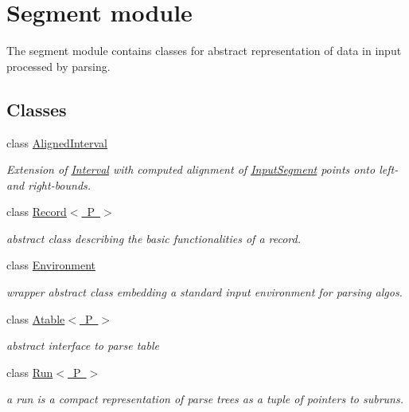 \hypertarget{group__segment}{}\section{Segment module}
\label{group__segment}


The {\ttfamily segment} module contains classes for abstract representation of data in input processed by parsing.  


\subsection*{Classes}
\begin{DoxyCompactItemize}
\item 
class \mbox{\hyperlink{classAlignedInterval}{Aligned\+Interval}}
\begin{DoxyCompactList}\small\item\em Extension of \mbox{\hyperlink{classInterval}{Interval}} with computed alignment of \mbox{\hyperlink{classInputSegment}{Input\+Segment}} points onto left-\/ and right-\/bounds. \end{DoxyCompactList}\item 
class \mbox{\hyperlink{classRecord}{Record$<$ P $>$}}
\begin{DoxyCompactList}\small\item\em abstract class describing the basic functionalities of a record. \end{DoxyCompactList}\item 
class \mbox{\hyperlink{classEnvironment}{Environment}}
\begin{DoxyCompactList}\small\item\em wrapper abstract class embedding a standard input environment for parsing algos. \end{DoxyCompactList}\item 
class \mbox{\hyperlink{classAtable}{Atable$<$ P $>$}}
\begin{DoxyCompactList}\small\item\em abstract interface to parse table \end{DoxyCompactList}\item 
class \mbox{\hyperlink{classRun}{Run$<$ P $>$}}
\begin{DoxyCompactList}\small\item\em a run is a compact representation of parse trees as a tuple of pointers to subruns. \end{DoxyCompactList}\item 

\end{DoxyCompactItemize}
